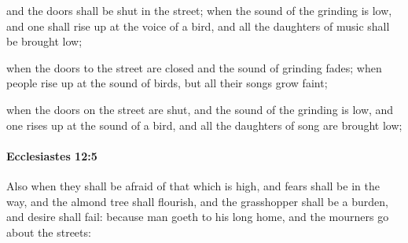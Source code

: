			\begin{versebox}
					\item[BHS] 
					\item[LXX] 
					\item[ASV] and the doors shall be shut in the street; when the sound of the grinding is low, and one shall rise up at the voice of a bird, and all the daughters of music shall be brought low;
					\item[NIV] when the doors to the street are closed and the sound of grinding fades; when people rise up at the sound of birds, but all their songs grow faint;
					\item[NRSV] when the doors on the street are shut, and the sound of the grinding is low, and one rises up at the sound of a bird, and all the daughters of song are brought low;
			\end{versebox}

		\paragraph{Ecclesiastes 12:5} %
			\label{ECCLESIASTES-12-5}

			Also when they shall be afraid of that which is high, and fears shall be in the way, and the almond tree shall flourish, and the grasshopper shall be a burden, and desire shall fail: because man goeth to his long home, and the mourners go about the streets:

